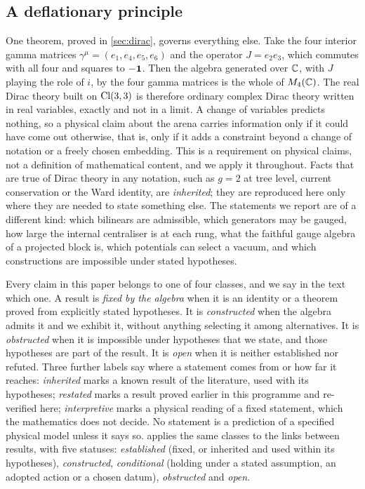 \subsection{A deflationary principle}
\label{sec:deflation}

One theorem, proved in \cref{sec:dirac}, governs everything else. Take the four interior gamma matrices
$\gamma^\mu=(e_1,e_4,e_5,e_6)$ and the operator $J=e_2e_3$, which commutes with all four and squares to $-\mathbf 1$. Then the
algebra generated over $\mathbb{C}$, with $J$ playing the role of $i$, by the four gamma matrices is the whole of $M_4(\mathbb{C})$. The
real Dirac theory built on $\mathrm{Cl}(3,3)$ is therefore ordinary complex Dirac theory written in real variables, exactly and
not in a limit. A change of variables predicts nothing, so a physical claim about the arena carries information only if it
could have come out otherwise, that is, only if it adds a constraint beyond a change of notation or a freely chosen embedding. This is a
requirement on physical claims, not a definition of mathematical content, and we apply it throughout. Facts that are true of Dirac theory in any notation, such as
$g=2$ at tree level, current conservation or the Ward identity, are \emph{inherited}; they are reproduced here only where
they are needed to state something else. The statements we report are of a different kind: which bilinears are admissible,
which generators may be gauged, how large the internal centraliser is at each rung, what the faithful gauge algebra of a
projected block is, which potentials can select a vacuum, and which constructions are impossible under stated
hypotheses.

Every claim in this paper belongs to one of four classes, and we say in the text which one. A result is \emph{fixed by the
algebra} when it is an identity or a theorem proved from explicitly stated hypotheses. It is \emph{constructed} when the algebra admits it
and we exhibit it, without anything selecting it among alternatives. It is \emph{obstructed} when it is impossible under
hypotheses that we state, and those hypotheses are part of the result. It is \emph{open} when it is neither established
nor refuted. Three further labels say where a statement comes from or how far it reaches: \emph{inherited} marks a known result of the
literature, used with its hypotheses; \emph{restated} marks a result proved earlier in this programme and re-verified here; \emph{interpretive}
marks a physical reading of a fixed statement, which the mathematics does not decide. No statement is a prediction of a specified physical
model unless it says so.  applies the same classes to the links between results, with five statuses:
\emph{established} (fixed, or inherited and used within its hypotheses), \emph{constructed}, \emph{conditional} (holding under a stated
assumption, an adopted action or a chosen datum), \emph{obstructed} and \emph{open}.

